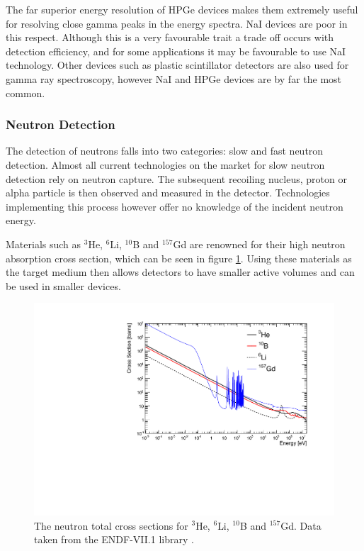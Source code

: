 The far superior energy resolution of HPGe devices makes them extremely useful for resolving close gamma peaks in the energy spectra. NaI devices are poor in this respect. Although this is a very favourable trait a trade off occurs with detection efficiency, and for some applications it may be favourable to use NaI technology. Other devices such as plastic scintillator detectors are also used for gamma ray spectroscopy, however NaI and HPGe devices are by far the most common.
 
\subsubsection{Neutron Detection}
The detection of neutrons falls into two categories: slow and fast neutron detection. 
Almost all current technologies on the market for slow neutron detection rely on neutron capture. The subsequent recoiling nucleus, proton or alpha particle is then observed and measured in the detector. Technologies implementing this process however offer no knowledge of the incident neutron energy.

Materials such as $^{3}$He, $^{6}$Li, $^{10}$B and $^{157}$Gd are renowned for their high neutron absorption cross section, which can be seen in figure \ref{fig:neutronXSec1}. Using these materials as the target medium then allows detectors to have smaller active volumes and can be used in smaller devices.

\begin{figure}[htbp]
\begin{center}
\includegraphics[width=120mm]{Chapter5/figures/neutronSlowMediaTotalXSec2.pdf}
\caption{The neutron total cross sections for $^{3}$He, $^{6}$Li, $^{10}$B and $^{157}$Gd. Data taken from the ENDF-VII.1 library \cite{endfLibrary}.}
\label{fig:neutronXSec1}
\end{center}
\end{figure}

